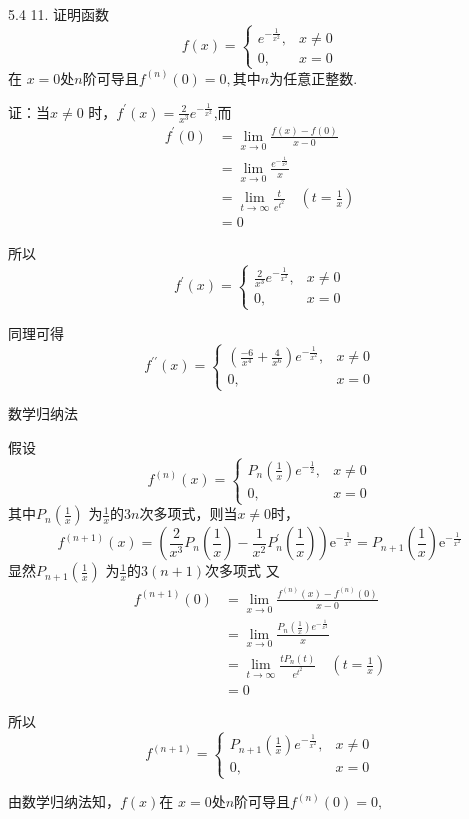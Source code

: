 \documentclass[12pt, a4paper]{ctexart}
\begin{document}
\begin{flushleft}
    5.4 11. 证明函数
    \[
f(x)=\left\{\begin{array}{ll}{e^{-\frac{1}{x^{2}}},} & {x \neq 0} \\ {0,} & {x=0}\end{array}\right.
\]
在 $ x = 0$处$n$阶可导且$f^{(n)}(0) = 0,$其中$n$为任意正整数.

    证：当$x \neq 0$ 时，$f^{\prime}(x) = \frac{ 2 }{ x ^ 3 } e ^{-\frac{ 1 }{ x^2 }}$,而
    \[
\begin{aligned} f^{\prime}(0) &=\lim _{x \rightarrow 0} \frac{f(x)-f(0)}{x-0} \\ &=\lim _{x \rightarrow 0} \frac{e^{-\frac{1}{x^{2}}}}{x} \\ &=\lim _{t \rightarrow \infty} \frac{t}{e^{t^{2}}} \quad\left(t=\frac{1}{x}\right) \\ &=0 \end{aligned}
\]

所以 \[
f^{\prime}(x)=\left\{\begin{array}{ll}{\frac{2}{x^{3}} e^{-\frac{1}{x^{2}}},} & {x \neq 0} \\ {0,} & {x=0}\end{array}\right.
\]

同理可得
\[
f^{\prime \prime}(x)=\left\{\begin{array}{ll}{\left(\frac{-6}{x^{4}}+\frac{4}{x^{6}}\right) e^{-\frac{1}{x^{2}}},} & {x \neq 0} \\ {0,} & {x=0}\end{array}\right.
\]

数学归纳法

假设
\[
f^{(n)}(x)=\left\{\begin{array}{ll}{P_{n}\left(\frac{1}{x}\right) e^{-\frac{1}{2}},} & {x \neq 0} \\ {0,} & {x=0}\end{array}\right.
\]
其中$P_n (\frac{ 1 }{ x })$ 为$ \frac{ 1 }{ x }$的$3n$次多项式，则当$x \neq 0$时，
\[
f^{(n + 1)}(x)=\left(\frac{2}{x^{3}} P_{n}\left(\frac{1}{x}\right)-\frac{1}{x^{2}} P_n ^{\prime}\left(\frac{1}{x}\right)\right) \mathrm{e}^{-\frac{1}{x^{2}}}=P_{n+1}\left(\frac{1}{x}\right) \mathrm{e}^{-\frac{1}{x^{2}}}
\]  
显然$P_{n+1} (\frac{ 1 }{ x })$ 为$ \frac{ 1 }{ x }$的$3(n+1)$次多项式
又
\[
\begin{aligned} f^{(n+1)}(0) &=\lim _{x \rightarrow 0} \frac{f^{(n)}(x)-f^{(n)}(0)}{x-0} \\ &=\lim _{x \rightarrow 0} \frac{P_{n}\left(\frac{1}{x}\right) e^{-\frac{1}{x^{2}}}}{x} \\ &=\lim _{t \rightarrow \infty} \frac{t P_{n}(t)}{e^{t^{2}}} \quad\left(t=\frac{1}{x}\right) \\ &=0 \end{aligned}
\]

所以
\[
f^{(n+1)}=\left\{\begin{array}{ll}{P_{n+1}\left(\frac{1}{x}\right) e^{-\frac{1}{x^{2}}},} & {x \neq 0} \\ {0,} & {x=0}\end{array}\right.
\]

由数学归纳法知，$f(x)$在 $ x = 0$处$n$阶可导且$f^{(n)}(0) = 0,$
    \end{flushleft}
\end{document}
